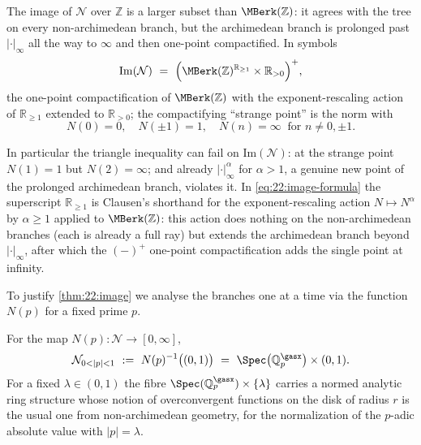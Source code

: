 \begin{theorem}
\label{thm:22:image}
The image of $\mathcal N$ over $\mathbb Z$ is a larger subset than
$\MBerk(\mathbb Z)$: it agrees with the tree on every non-archimedean branch,
but the archimedean branch is prolonged past $|\cdot|_\infty$ all the way to
$\infty$ and then one-point compactified. In symbols
\begin{equation}
\label{eq:22:image-formula}
\mathrm{Im}(\mathcal N)\ =\ \Bigl(\MBerk(\mathbb Z)^{\mathbb R_{\ge1}}\times
\mathbb R_{>0}\Bigr)^{+},
\end{equation}
the one-point compactification of $\MBerk(\mathbb Z)$ with the exponent-rescaling
action of $\mathbb R_{\ge1}$ extended to $\mathbb R_{>0}$; the compactifying
``strange point'' is the norm with
\begin{equation*}
N(0)=0,\quad N(\pm1)=1,\quad N(n)=\infty\ \text{ for } n\neq0,\pm1 .
\end{equation*}
\end{theorem}

\begin{remark}
\label{rmk:22:triangle-fails}
In particular the triangle inequality can fail on $\mathrm{Im}(\mathcal N)$: at
the strange point $N(1)=1$ but $N(2)=\infty$; and already $|\cdot|_\infty^\alpha$
for $\alpha>1$, a genuine new point of the prolonged archimedean branch,
violates it. In \eqref{eq:22:image-formula} the superscript $\mathbb R_{\ge1}$ is
Clausen's shorthand for the exponent-rescaling action $N\mapsto N^{\alpha}$ by
$\alpha\ge1$ applied to $\MBerk(\mathbb Z)$: this action does nothing on the
non-archimedean branches (each is already a full ray) but extends the archimedean
branch beyond $|\cdot|_\infty$, after which the $(-)^{+}$ one-point
compactification adds the single point at infinity.
\end{remark}

To justify \cref{thm:22:image} we analyse the branches one at a time via the
function $N(p)$ for a fixed prime $p$.

\begin{proposition}
\label{prop:22:p-branch}
For the map $N(p)\colon\mathcal N\to[0,\infty]$,
\begin{equation*}
\mathcal N_{0<|p|<1}\ :=\ N(p)^{-1}\bigl((0,1)\bigr)\ =\ \Spec\bigl(\mathbb
Q_{p}^{\gasx}\bigr)\times(0,1).
\end{equation*}
For a fixed $\lambda\in(0,1)$ the fibre $\Spec(\mathbb Q_p^{\gasx})\times
\{\lambda\}$ carries a normed analytic ring structure whose notion of
overconvergent functions on the disk of radius $r$ is the usual one from
non-archimedean geometry, for the normalization of the $p$-adic absolute value
with $|p|=\lambda$.
\end{proposition}

